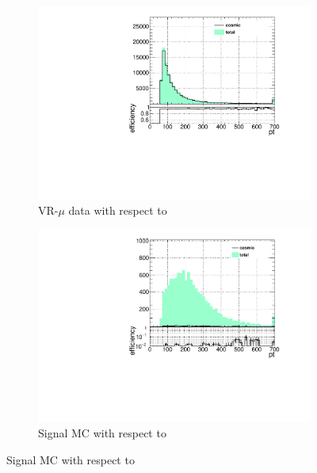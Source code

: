 \begin{figure}[!ht]
  \centering
  \begin{subfigure}[b]{0.4\textwidth}
 	\includegraphics[width=\textwidth]{figures/cosmics/wider_tag_ratio_pt.pdf}
  	\caption{VR-$\mu$ data with respect to \pt}
  \end{subfigure}
  \begin{subfigure}[b]{0.4\textwidth}
 	\includegraphics[width=\textwidth]{figures/cosmics/mc_300_ratio_pt.pdf}
  	\caption{Signal \ac{MC} with respect to \pt}
  \end{subfigure}


\end{figure}
